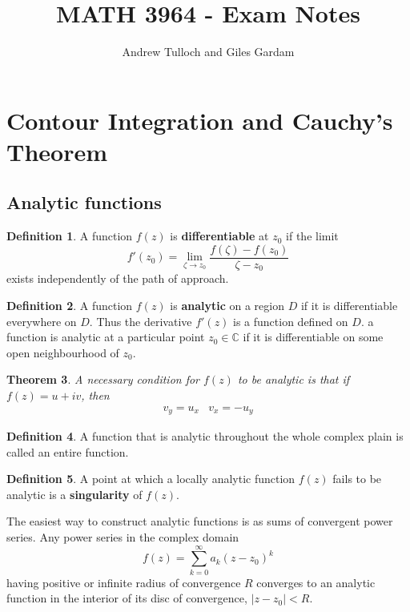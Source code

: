 \documentclass[10pt, oneside, reqno]{amsart}
\title{MATH 3964 - Exam Notes}								%
\author{Andrew Tulloch and Giles Gardam}
\theoremstyle{plain}%
\newtheorem{thm}{Theorem}[section]
\theoremstyle{definition}
\newtheorem{defn}[thm]{Definition}
\theoremstyle{remark}
\newcommand{\Com}{\mathbb{C}}
\begin{document}
\maketitle



\section{Contour Integration and Cauchy's Theorem} %

\subsection{Analytic functions} %
\label{sec:analytic_functions}


\begin{defn}
	A function $f(z)$ is \textbf{differentiable} at $z_0$ if the limit \[
		f'(z_0) = \lim_{\zeta \rightarrow z_0} \frac{f(\zeta) - f(z_0)}{\zeta - z_0}
	\] exists independently of the path of approach.
\end{defn}

\begin{defn}
	A function $f(z)$ is \textbf{analytic} on a region $D$ if it is differentiable everywhere on $D$.  Thus the derivative $f'(z)$ is a function defined on $D$.  a function is analytic at a particular point $z_0 \in \Com$ if it is differentiable on some open neighbourhood of $z_0$.
\end{defn}

\begin{thm}
	A necessary condition for $f(z)$ to be analytic is that if $f(z) = u + iv$, then 
	\begin{align*}
		v_y = u_x & v_x = -u_y
	\end{align*}
\end{thm}

\begin{defn}
	A function that is analytic throughout the whole complex plain is called an entire function.
\end{defn}

\begin{defn}
	A point at which a locally analytic function $f(z)$ fails to be analytic is a \textbf{singularity} of $f(z)$.
\end{defn}

The easiest way to construct analytic functions is as sums of convergent power series.  Any power series in the complex domain \[
	f(z) = \sum_{k=0}^\infty a_k (z-z_0)^k
\] having positive or infinite radius of convergence $R$ converges to an analytic function in the interior of its disc of convergence, $|z-z_0| < R$.
\end{document}
